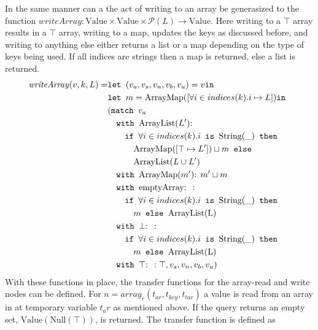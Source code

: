 In the same manner can a the act of writing to an array be generasized to the function $\mathit{writeArray}: \text{Value} \times \text{Value} \times \mathcal{P}(L) \rightarrow \text{Value}$. Here writing to a $\top$ array results in a $\top$ array, writing to a map, updates the keys as discussed before, and writing to anything else either returns a list or a map depending on the type of keys being used. If all indices are strings then a map is returned, else a list is returned. 
\begin{align}
\mathit{writeArray}(v, k, L) =       & \texttt{let } (v_a,v_s,v_n,v_b,v_u) = v \texttt{in }\notag\\
                            &\texttt{let } m = \text{ArrayMap}([\forall i \in indices(k). i \mapsto L]) \texttt{in }\notag\\
                            &(\texttt{match }v_a \notag\\
                            & \quad \texttt{with }\text{ArrayList}(L')\text{: } \notag\\
                            &\quad\quad \texttt{if }\forall i \in indices(k).i \texttt{ is } \text{String}(\_)\texttt{ then } \notag\\
                            &\quad\quad\quad \text{ArrayMap}([\top \mapsto L'])\sqcup m \texttt{ else } \notag\\
                            &\quad\quad\quad \text{ArrayList}(L\cup L')\notag\\
                            & \quad \texttt{with }\text{ArrayMap}(m')\text{: } m'\sqcup m\notag\\
                            & \quad \texttt{with }\text{emptyArray}\text{: } : \notag\\
                            & \quad\quad\texttt{if }\forall i \in indices(k).i \texttt{ is } \text{String}(\_)\texttt{ then } \notag\\
                            &\quad\quad\quad m \texttt{ else } \text{ArrayList(L)}\notag\\
                            & \quad \texttt{with }\bot\text{: }  : \notag\\
                            & \quad\quad\texttt{if }\forall i \in indices(k).i \texttt{ is } \text{String}(\_)\texttt{ then } \notag\\
                            &\quad\quad\quad m \texttt{ else } \text{ArrayList(L)}\notag\\
                            & \quad \texttt{with }\top\text{: } : \top, v_s, v_n, v_b, v_u)
\end{align}
With these functions in place, the transfer functions for the array-read and write nodes can be defined. For $n = \mathit{array}_r(t_{ar},t_{key},t_{tar})$ a value is read from an array in at temporary variable $t_ar$ as mentioned above. If the query returns an empty set, $\text{Value}(\text{Null}(\top))$, is returned. The transfer function is defined as
